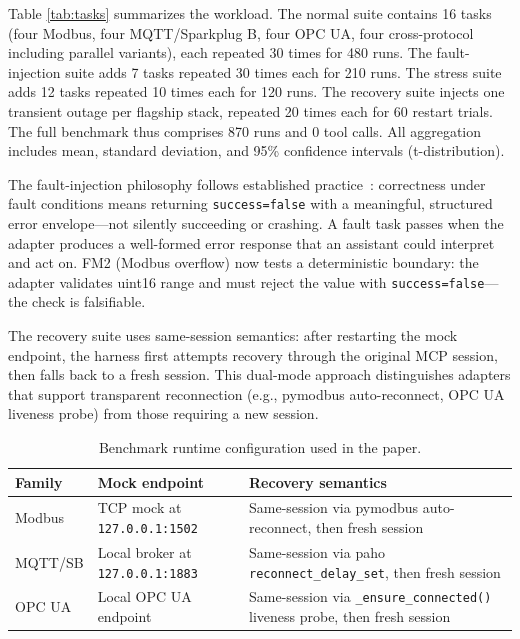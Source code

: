 \documentclass[conference]{IEEEtran}
\newcommand{\totalNormalRuns}{480}
\newcommand{\totalFaultRuns}{210}
\newcommand{\totalStressRuns}{120}
\newcommand{\totalRecoveryTrials}{60}
\newcommand{\totalRuns}{870}
\newcommand{\totalToolCalls}{0}
\begin{document}
Table \ref{tab:tasks} summarizes the workload. The normal suite contains 16 tasks (four Modbus, four MQTT/Sparkplug B, four OPC UA, four cross-protocol including parallel variants), each repeated 30 times for \totalNormalRuns{} runs. The fault-injection suite adds 7 tasks repeated 30 times each for \totalFaultRuns{} runs. The stress suite adds 12 tasks repeated 10 times each for \totalStressRuns{} runs. The recovery suite injects one transient outage per flagship stack, repeated 20 times each for \totalRecoveryTrials{} restart trials. The full benchmark thus comprises \totalRuns{} runs and \totalToolCalls{} tool calls. All aggregation includes mean, standard deviation, and 95\% confidence intervals (t-distribution).

The fault-injection philosophy follows established practice~\cite{natella2016faultinjection}: correctness under fault conditions means returning \texttt{success=false} with a meaningful, structured error envelope---not silently succeeding or crashing. A fault task passes when the adapter produces a well-formed error response that an assistant could interpret and act on. FM2 (Modbus overflow) now tests a deterministic boundary: the adapter validates uint16 range and must reject the value with \texttt{success=false}---the check is falsifiable.

The recovery suite uses same-session semantics: after restarting the mock endpoint, the harness first attempts recovery through the original MCP session, then falls back to a fresh session. This dual-mode approach distinguishes adapters that support transparent reconnection (e.g., pymodbus auto-reconnect, OPC UA liveness probe) from those requiring a new session.

\begin{table}[t]
    \caption{Benchmark runtime configuration used in the paper.}
    \label{tab:runtime}
    \centering
    \scriptsize
    \begin{tabularx}{\columnwidth}{@{}lYY@{}}
        \toprule
        Family & Mock endpoint & Recovery semantics \\
        \midrule
        Modbus & TCP mock at \texttt{127.0.0.1:1502} & Same-session via pymodbus auto-reconnect, then fresh session \\
        MQTT/SB & Local broker at \texttt{127.0.0.1:1883} & Same-session via paho \texttt{reconnect\_delay\_set}, then fresh session \\
        OPC UA & Local OPC UA endpoint & Same-session via \texttt{\_ensure\_connected()} liveness probe, then fresh session \\
        \bottomrule
    \end{tabularx}
\end{table}
\end{document}
